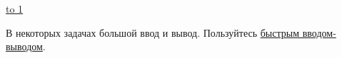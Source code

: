 \documentclass[12pt,a4paper,oneside]{article}
\newcommand{\ProblemLabel}{undefined}
\newcommand{\ProblemTL}{undefined}
\newcommand{\ProblemML}{undefined}
\newcommand{\ProblemName}{undefined}
\def\LINE{\vspace*{-1em}\noindent \underline{\hbox to 1\textwidth{{ } \hfil{ } \hfil{ } }}}
\def\probl#1#2#3#4{
  \renewcommand{\ProblemName}{#1}
  \renewcommand{\ProblemLabel}{#2}
  \renewcommand{\ProblemTL}{#3}
  \renewcommand{\ProblemML}{#4}
  
}
\begin{document}
\vspace*{-2.8em}

\tableofcontents

\vspace*{0.8em}
\LINE
\vspace*{0.8em}


\noindent{}В некоторых задачах большой ввод и вывод. 
Пользуйтесь \href{https://ejudge.lksh.ru/A/lib/example_io.cpp.html}{быстрым вводом-выводом}.

\pagebreak

\probl{pqueue}{A}{0.45 sec}{256 mb}
\probl{gyakkyou}{B}{4 sec}{256 mb}
\probl{intercity}{C}{1.5 sec}{256 mb}
\probl{inside2}{D}{3.5 sec}{256 mb}
\end{document}
